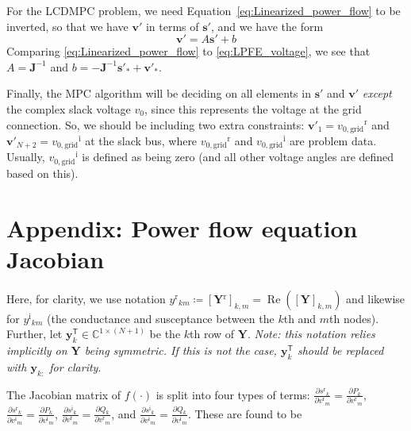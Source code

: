 \documentclass{article}
\newcommand{\tran}{^{\mathsf{T}}}
\renewcommand{\Re}{\ensuremath{\operatorname{Re}}}
\newcommand{\im}{\ensuremath{^{\mathrm{i}}}}
\newcommand{\re}{\ensuremath{^{\mathrm{r}}}}
\begin{document}
For the LCDMPC problem, we need Equation~\eqref{eq:Linearized_power_flow} to be
inverted, so that we have $\mathbf{v}'$ in terms of $\mathbf{s}'$, and we have
the form 
\begin{equation}\label{eq:LPFE_voltage}
    \mathbf{v}' = A\mathbf{s}' + b
\end{equation}
Comparing \eqref{eq:Linearized_power_flow} to \eqref{eq:LPFE_voltage}, we see 
that $A = \mathbf{J}^{-1}$ and 
$b = -\mathbf{J}^{-1}\mathbf{s}'_* + \mathbf{v}'_*$.

Finally, the MPC algorithm will be deciding on all elements in $\mathbf{s}'$ and
$\mathbf{v}'$ \emph{except} the complex slack voltage $v_0$, since this 
represents the voltage at the grid connection. So, we should be 
including two extra constraints: 
$\mathbf{v}'_1 = v_{0,\mathrm{grid}}\re$ and 
$\mathbf{v}'_{N+2} = v_{0,\mathrm{grid}}\im$ at the slack bus, where 
$v_{0,\mathrm{grid}}\re$ and $v_{0,\mathrm{grid}}\im$ are problem data. 
Usually, $v_{0,\mathrm{grid}}\im$ is defined as being zero (and all other
voltage angles are defined based on this).

\section*{Appendix: Power flow equation Jacobian}

Here, for clarity, we use notation
$y\re_{km} \coloneqq [\mathbf{Y}\re]_{k,m} = 
\Re([\mathbf{Y}]_{k,m})$ and likewise
for $y\im_{km}$ (the conductance and susceptance between the $k$th and $m$th
nodes). Further, let $\mathbf{y}_{k}\tran \in \mathbb{C}^{1\times (N+1)}$ be the
$k$th row of $\mathbf{Y}$. 
\emph{Note: this notation relies implicitly on $\mathbf{Y}$ 
being symmetric. If this is not the case, $\mathbf{y}_{k}\tran$ should be 
replaced with  $\mathbf{y}_{k:}$ for clarity}. 

The Jacobian matrix of $f(\cdot)$ is split into four types of terms:
$\frac{\partial {s}\re_k}{\partial {v}\re_m} =
\frac{\partial {P}_k}{\partial {v}\re_m}$, 
$\frac{\partial {s}\re_k}{\partial {v}\im_m} =
\frac{\partial {P}_k}{\partial {v}\im_m}$, 
$\frac{\partial {s}\im_k}{\partial {v}\re_m} =
\frac{\partial {Q}_k}{\partial {v}\re_m}$, and
$\frac{\partial {s}\im_k}{\partial {v}\im_m} =
\frac{\partial {Q}_k}{\partial {v}\im_m}$. 
These are found to be
\end{document}
